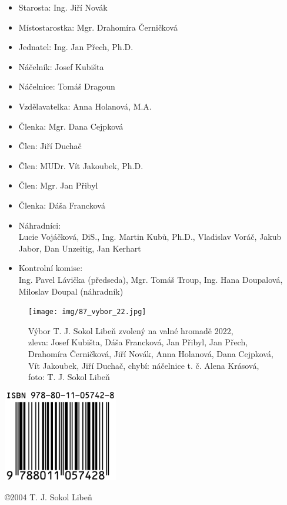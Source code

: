 \documentclass[a5paper, 11pt, twoside]{article}
\begin{document}
\begin{itemize}[label={},itemindent=-2em,leftmargin=2em]
  \setlength{\itemsep}{-4pt}
  \item Starosta: Ing. Jiří Novák
  \item Místostarostka: Mgr. Drahomíra Černičková
  \item Jednatel: Ing. Jan Přech, Ph.D.
  \item Náčelník: Josef Kubišta
  \item Náčelnice: Tomáš Dragoun
  \item Vzdělavatelka: Anna Holanová, M.A.
  \item Členka: Mgr. Dana Cejpková
  \item Člen: Jiří Duchač
  \item Člen: MUDr. Vít Jakoubek, Ph.D.
  \item Člen: Mgr. Jan Přibyl
  \item Členka: Dáša Francková
  \item Náhradníci:\\ Lucie Vojáčková, DiS., Ing. Martin Kubů, Ph.D., Vladislav Voráč, Jakub Jabor, Dan Unzeitig, Jan Kerhart
  \item Kontrolní komise:\\ Ing. Pavel Lávička (předseda), Mgr. Tomáš Troup, Ing. Hana Doupalová, Miloslav Doupal (náhradník)
\end{itemize}

\begin{figure}[h!]
  \centering
  \texttt{[image: img/87\_vybor\_22.jpg]}
  \caption*{Výbor T. J. Sokol Libeň zvolený na valné hromadě 2022,\\zleva:
  Josef Kubišta, Dáša Francková, Jan Přibyl, Jan Přech, Drahomíra
  Černičková, Jiří Novák, Anna Holanová, Dana Cejpková, Vít Jakoubek, Jiří
  Duchač, chybí: náčelnice t. č. Alena Krásová, foto: T. J. Sokol Libeň}
\end{figure}

\clearpage
\null
\clearpage

\pagecolor{sokolred}
\color{white}
\centering
\null
\vspace{\fill}

\includegraphics[width=5cm]{img/88_isbn.png}

\vspace*{11pt}
\copyright 2004 T. J. Sokol Libeň
\vspace{2cm}
\end{document}
